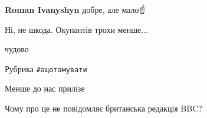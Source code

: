 \begin{itemize}
\begin{itemize}
 
\textbf{Roman Ivanyshyn} добре, але мало☝️\Laughey[1.0][white]
\end{itemize}

 
Ні, не шкода. Окупантів трохи менше...

 
чудово


 
Рубрика \verb|#ащотамувати|

 
Менше до нас прилізе

 
Чому про це не повідомляє британська редакція BBC?

 


\end{itemize}
